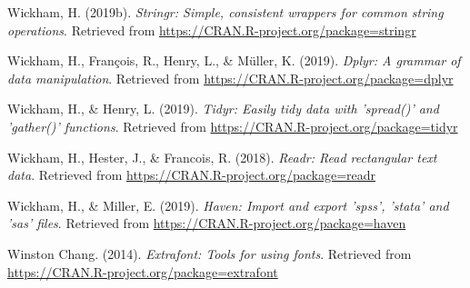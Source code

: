 \documentclass[man]{apa6}
\begin{document}
\leavevmode\hypertarget{ref-R-stringr}{}%
Wickham, H. (2019b). \emph{Stringr: Simple, consistent wrappers for common string operations}. Retrieved from \url{https://CRAN.R-project.org/package=stringr}

\leavevmode\hypertarget{ref-R-dplyr}{}%
Wickham, H., François, R., Henry, L., \& Müller, K. (2019). \emph{Dplyr: A grammar of data manipulation}. Retrieved from \url{https://CRAN.R-project.org/package=dplyr}

\leavevmode\hypertarget{ref-R-tidyr}{}%
Wickham, H., \& Henry, L. (2019). \emph{Tidyr: Easily tidy data with 'spread()' and 'gather()' functions}. Retrieved from \url{https://CRAN.R-project.org/package=tidyr}

\leavevmode\hypertarget{ref-R-readr}{}%
Wickham, H., Hester, J., \& Francois, R. (2018). \emph{Readr: Read rectangular text data}. Retrieved from \url{https://CRAN.R-project.org/package=readr}

\leavevmode\hypertarget{ref-R-haven}{}%
Wickham, H., \& Miller, E. (2019). \emph{Haven: Import and export 'spss', 'stata' and 'sas' files}. Retrieved from \url{https://CRAN.R-project.org/package=haven}

\leavevmode\hypertarget{ref-R-extrafont}{}%
Winston Chang. (2014). \emph{Extrafont: Tools for using fonts}. Retrieved from \url{https://CRAN.R-project.org/package=extrafont}

\endgroup

\theendnotes
\end{document}
